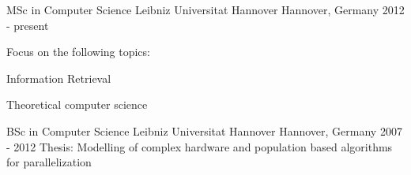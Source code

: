 

\begin{cventries}

  \cventry
    {MSc in Computer Science} %
    {Leibniz Universitat Hannover} %
    {Hannover, Germany} %
    {2012 - present} %
    {Focus on the following topics:\vspace{5mm}
	    \begin{cvitems}
	    \item {Information Retrieval}
	    \item {Theoretical computer science}
	    \end{cvitems}
    }

  \cventry
    {BSc in Computer Science} %
    {Leibniz Universitat Hannover} %
    {Hannover, Germany} %
    {2007 - 2012} %
    {Thesis: Modelling of complex hardware and population based algorithms for parallelization}


\end{cventries}
